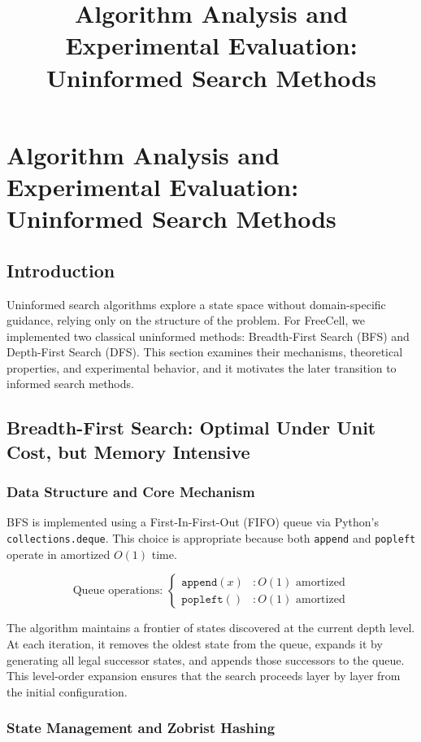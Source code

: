 \documentclass{article}
\title{Algorithm Analysis and Experimental Evaluation: Uninformed Search Methods}
\author{}
\date{}
\begin{document}
\section{Algorithm Analysis and Experimental Evaluation: Uninformed Search Methods}

\subsection{Introduction}

Uninformed search algorithms explore a state space without domain-specific guidance, relying only on the structure of the problem. For FreeCell, we implemented two classical uninformed methods: Breadth-First Search (BFS) and Depth-First Search (DFS). This section examines their mechanisms, theoretical properties, and experimental behavior, and it motivates the later transition to informed search methods.

\subsection{Breadth-First Search: Optimal Under Unit Cost, but Memory Intensive}

\subsubsection{Data Structure and Core Mechanism}

BFS is implemented using a First-In-First-Out (FIFO) queue via Python's \texttt{collections.deque}. This choice is appropriate because both \texttt{append} and \texttt{popleft} operate in amortized $O(1)$ time.

\begin{equation}
\text{Queue operations: } \begin{cases}
\texttt{append}(x) & : O(1) \text{ amortized} \\
\texttt{popleft}() & : O(1) \text{ amortized}
\end{cases}
\end{equation}

The algorithm maintains a frontier of states discovered at the current depth level. At each iteration, it removes the oldest state from the queue, expands it by generating all legal successor states, and appends those successors to the queue. This level-order expansion ensures that the search proceeds layer by layer from the initial configuration.

\subsubsection{State Management and Zobrist Hashing}
\end{document}

